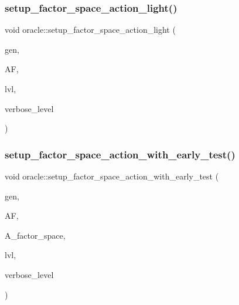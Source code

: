 \mbox{\label{classoracle_aaa6ca8694ae3452bc3ca812cbcc80fc7}} 
\subsubsection{\texorpdfstring{setup\+\_\+factor\+\_\+space\+\_\+action\+\_\+light()}{setup\_factor\_space\_action\_light()}}
{\footnotesize\ttfamily void oracle\+::setup\+\_\+factor\+\_\+space\+\_\+action\+\_\+light (\begin{DoxyParamCaption}\item[{\mbox{\hyperlink{classgenerator}{generator}} $\ast$}]{gen,  }\item[{\mbox{\hyperlink{classaction__on__factor__space}{action\+\_\+on\+\_\+factor\+\_\+space}} \&}]{AF,  }\item[{\mbox{\hyperlink{galois_8h_a09fddde158a3a20bd2dcadb609de11dc}{I\+NT}}}]{lvl,  }\item[{\mbox{\hyperlink{galois_8h_a09fddde158a3a20bd2dcadb609de11dc}{I\+NT}}}]{verbose\+\_\+level }\end{DoxyParamCaption})}

\mbox{\label{classoracle_a7c26a85886666829e9727df91d2f01ad}} 
\subsubsection{\texorpdfstring{setup\+\_\+factor\+\_\+space\+\_\+action\+\_\+with\+\_\+early\+\_\+test()}{setup\_factor\_space\_action\_with\_early\_test()}}
{\footnotesize\ttfamily void oracle\+::setup\+\_\+factor\+\_\+space\+\_\+action\+\_\+with\+\_\+early\+\_\+test (\begin{DoxyParamCaption}\item[{\mbox{\hyperlink{classgenerator}{generator}} $\ast$}]{gen,  }\item[{\mbox{\hyperlink{classaction__on__factor__space}{action\+\_\+on\+\_\+factor\+\_\+space}} \&}]{AF,  }\item[{\mbox{\hyperlink{classaction}{action}} \&}]{A\+\_\+factor\+\_\+space,  }\item[{\mbox{\hyperlink{galois_8h_a09fddde158a3a20bd2dcadb609de11dc}{I\+NT}}}]{lvl,  }\item[{\mbox{\hyperlink{galois_8h_a09fddde158a3a20bd2dcadb609de11dc}{I\+NT}}}]{verbose\+\_\+level }\end{DoxyParamCaption})}

